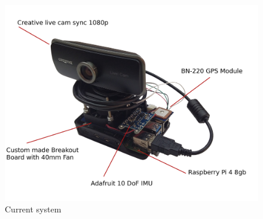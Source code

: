\begin{figure}[thpb]
  \centering
  \includegraphics[width=\linewidth]{Images/thesis-system.jpg}
  \caption{Current system }
  \label{fig:1}
\end{figure}




